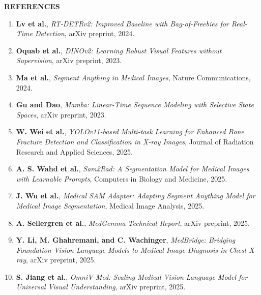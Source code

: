 \documentclass[12pt,a4paper]{article}
\begin{document}
\clearpage
\thispagestyle{empty}
\begin{center}
  {\fontsize{13.2pt}{16pt}\selectfont\bfseries REFERENCES\par}
\end{center}
\vspace{16pt}
{\fontsize{11.3pt}{25.8pt}\selectfont
\begin{enumerate}[label=\arabic*.,leftmargin=23pt,labelsep=6pt,itemsep=9pt,topsep=0pt,parsep=0pt]
\item \textbf{Lv et al.}, \textit{RT-DETRv2: Improved Baseline with Bag-of-Freebies for Real-Time Detection}, arXiv preprint, 2024.
\item \textbf{Oquab et al.}, \textit{DINOv2: Learning Robust Visual Features without Supervision}, arXiv preprint, 2023.
\item \textbf{Ma et al.}, \textit{Segment Anything in Medical Images}, Nature Communications, 2024.
\item \textbf{Gu and Dao}, \textit{Mamba: Linear-Time Sequence Modeling with Selective State Spaces}, arXiv preprint, 2023.
\item \textbf{W. Wei et al.}, \textit{YOLOv11-based Multi-task Learning for Enhanced Bone Fracture Detection and Classification in X-ray Images}, Journal of Radiation Research and Applied Sciences, 2025.
\item \textbf{A. S. Wahd et al.}, \textit{Sam2Rad: A Segmentation Model for Medical Images with Learnable Prompts}, Computers in Biology and Medicine, 2025.
\item \textbf{J. Wu et al.}, \textit{Medical SAM Adapter: Adapting Segment Anything Model for Medical Image Segmentation}, Medical Image Analysis, 2025.
\item \textbf{A. Sellergren et al.}, \textit{MedGemma Technical Report}, arXiv preprint, 2025.
\item \textbf{Y. Li, M. Ghahremani, and C. Wachinger}, \textit{MedBridge: Bridging Foundation Vision-Language Models to Medical Image Diagnosis in Chest X-ray}, arXiv preprint, 2025.
\item \textbf{S. Jiang et al.}, \textit{OmniV-Med: Scaling Medical Vision-Language Model for Universal Visual Understanding}, arXiv preprint, 2025.
\end{enumerate}
}
\end{document}
